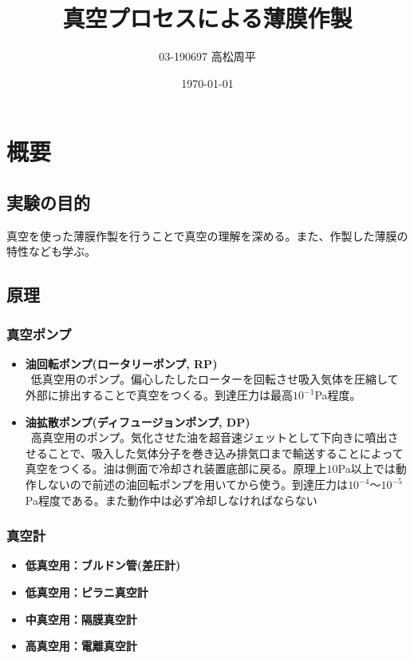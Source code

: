 \documentclass{jsarticle}
\title{真空プロセスによる薄膜作製}
\author{03-190697 高松周平}
\date{\today}
\begin{document}
\maketitle
\section{概要}
\subsection{実験の目的}
真空を使った薄膜作製を行うことで真空の理解を深める。また、作製した薄膜の特性なども学ぶ。\\
\subsection{原理}
\subsubsection{真空ポンプ}
\begin{itemize}
\item \textbf{油回転ポンプ(ロータリーポンプ, RP)}\\
\ 低真空用のポンプ。偏心したしたローターを回転させ吸入気体を圧縮して外部に排出することで真空をつくる。到達圧力は最高$10^{-1}$Pa程度。
\item \textbf{油拡散ポンプ(ディフュージョンポンプ, DP)}\\
\ 高真空用のポンプ。気化させた油を超音速ジェットとして下向きに噴出させることで、吸入した気体分子を巻き込み排気口まで輸送することによって真空をつくる。油は側面で冷却され装置底部に戻る。原理上$10$Pa以上では動作しないので前述の油回転ポンプを用いてから使う。到達圧力は$10^{-4}$〜$10^{-5}$Pa程度である。また動作中は必ず冷却しなければならない
\end{itemize}
\subsubsection{真空計}
\begin{itemize}
\item \textbf{低真空用：ブルドン管(差圧計)}
\item \textbf{低真空用：ピラニ真空計}
\item \textbf{中真空用：隔膜真空計}
\item \textbf{高真空用：電離真空計}
\end{itemize}
\end{document}

